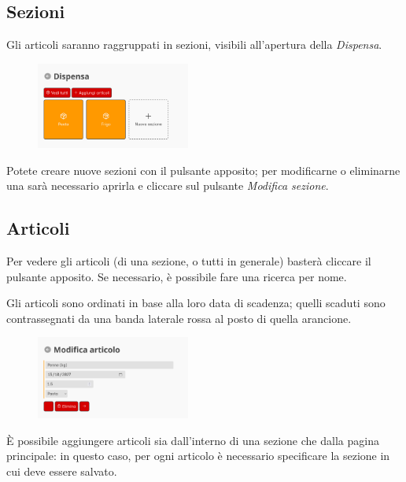 \documentclass[12pt, a4paper]{article}
\begin{document}
	\subsection{Sezioni}

    Gli articoli saranno raggruppati in sezioni, visibili all'apertura della
    \emph{Dispensa}.

    \begin{figure}[H]
        \centering
        \includegraphics[width=0.45\textwidth]{assets/it/storage.png}
    \end{figure}

    Potete creare nuove sezioni con il pulsante apposito; per modificarne
    o eliminarne una sarà necessario aprirla e cliccare sul pulsante
    \emph{Modifica sezione}.

    \subsection{Articoli}

	Per vedere gli articoli (di una sezione, o tutti in generale) basterà
    cliccare il pulsante apposito. Se necessario, è possibile fare una ricerca
	per nome.

    Gli articoli sono ordinati in base alla loro data di scadenza; quelli
    scaduti sono contrassegnati da una banda laterale rossa al posto di quella
    arancione.

    \begin{figure}[H]
        \centering
        \includegraphics[width=0.45\textwidth]{assets/it/articles.png}
    \end{figure}

    È possibile aggiungere articoli sia dall'interno di una sezione che dalla
    pagina principale: in questo caso, per ogni articolo è necessario
    specificare la sezione in cui deve essere salvato.
\end{document}

